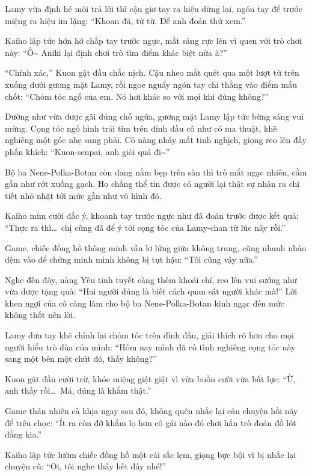 \documentclass[../main.tex]{subfiles}
\begin{document}
Lamy vừa định hé môi trả lời thì cậu giơ tay ra hiệu dừng lại, ngón tay để trước miệng ra hiệu im lặng: ``Khoan đã, từ từ. Để anh đoán thử xem.''

Kaiho lập tức hớn hở chắp tay trước ngực, mắt sáng rực lên vì quen với trò chơi này: ``Ồ\~{} Aniki lại định chơi trò tìm điểm khác biệt nữa à?''

``Chính xác,'' Kuon gật đầu chắc nịch. Cậu nheo mắt quét qua một lượt từ trên xuống dưới gương mặt Lamy, rồi ngoe nguẩy ngón tay chỉ thẳng vào điểm mấu chốt: ``Chỏm tóc ngố của em. Nó hơi khác so với mọi khi đúng không?''

Dường như vừa được gãi đúng chỗ ngứa, gương mặt Lamy lập tức bừng sáng vui mừng. Cọng tóc ngố hình trái tim trên đỉnh đầu cô như có ma thuật, khẽ nghiêng một góc nhẹ sang phải. Cô nàng nháy mắt tinh nghịch, giọng reo lên đầy phấn khích: ``Kuon-senpai, anh giỏi quá đi\~{}''


Bộ ba Nene-Polka-Botan còn đang nằm bẹp trên sàn thì trố mắt ngạc nhiên, cằm gần như rớt xuống gạch. Họ chẳng thể tin được có người lại thật sự nhận ra chi tiết nhỏ nhặt tới mức gần như vô hình đó.

Kaiho mỉm cười đắc ý, khoanh tay trước ngực như đã đoán trước được kết quả: ``Thực ra thì\dots\ chị cũng đã để ý tới cọng tóc của Lamy-chan từ lúc nãy rồi.''

Game, chiếc đồng hồ thông minh vẫn lơ lửng giữa không trung, cũng nhanh nhảu đệm vào để chứng minh mình không bị tụt hậu: ``Tôi cũng vậy nữa.''

Nghe đến đây, nàng Yêu tinh tuyết càng thêm khoái chí, reo lên vui sướng như vừa được tặng quà: ``Hai người đúng là biết cách quan sát người khác mà!'' Lời khen ngợi của cô càng làm cho bộ ba Nene-Polka-Botan kinh ngạc đến mức không thốt nên lời.

Lamy đưa tay khẽ chỉnh lại chỏm tóc trên đỉnh đầu, giải thích rõ hơn cho mọi người hiểu trò đùa của mình: ``Hôm nay mình đã cố tình nghiêng cọng tóc này sang một bên một chút đó, thấy không?''

Kuon gật đầu cười trừ, khóe miệng giật giật vì vừa buồn cười vừa bất lực: ``Ừ, anh thấy rồi\dots\ Má, đúng là khắm thật.''

Game thản nhiên cà khịa ngay sau đó, không quên nhắc lại câu chuyện hồi nãy để trêu chọc: ``Ít ra còn đỡ khắm lọ hơn cô gái nào đó chơi hẳn trò đoán đồ lót đằng kia.''

Kaiho lập tức lườm chiếc đồng hồ một cái sắc lẹm, giọng bực bội vì bị nhắc lại chuyện cũ: ``Oi, tôi nghe thấy hết đấy nhé!''
\end{document}
